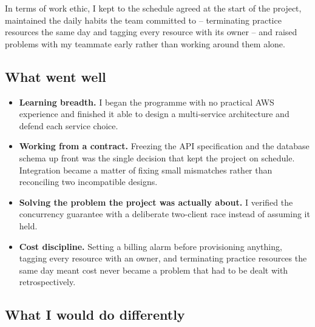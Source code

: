 In terms of work ethic, I kept to the schedule agreed at the start of the
project, maintained the daily habits the team committed to -- terminating
practice resources the same day and tagging every resource with its owner --
and raised problems with my teammate early rather than working around them
alone.

\subsection{What went well}

\begin{itemize}
    \setlength\itemsep{0.2em}
    \item \textbf{Learning breadth.} I began the programme with no practical AWS
    experience and finished it able to design a multi-service architecture and
    defend each service choice.

    \item \textbf{Working from a contract.} Freezing the API specification and
    the database schema up front was the single decision that kept the project
    on schedule. Integration became a matter of fixing small mismatches rather
    than reconciling two incompatible designs.

    \item \textbf{Solving the problem the project was actually about.} I
    verified the concurrency guarantee with a deliberate two-client race instead
    of assuming it held.

    \item \textbf{Cost discipline.} Setting a billing alarm before provisioning
    anything, tagging every resource with an owner, and terminating practice
    resources the same day meant cost never became a problem that had to be
    dealt with retrospectively.
\end{itemize}

\subsection{What I would do differently}


